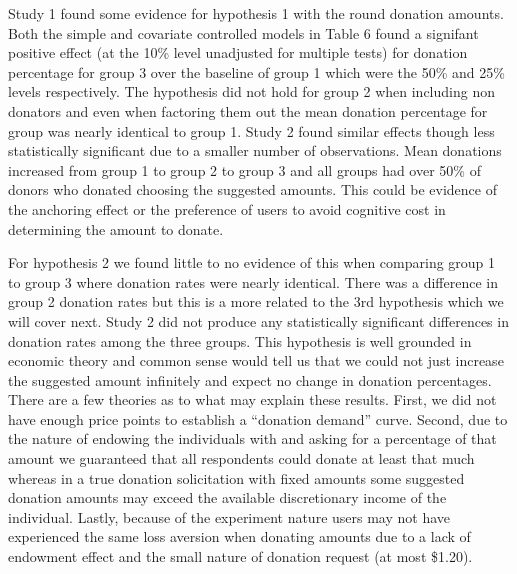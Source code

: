 \documentclass[]{article}
\begin{document}
Study 1 found some evidence for hypothesis 1 with the round donation
amounts. Both the simple and covariate controlled models in Table 6
found a signifant positive effect (at the 10\% level unadjusted for
multiple tests) for donation percentage for group 3 over the baseline of
group 1 which were the 50\% and 25\% levels respectively. The hypothesis
did not hold for group 2 when including non donators and even when
factoring them out the mean donation percentage for group was nearly
identical to group 1. Study 2 found similar effects though less
statistically significant due to a smaller number of observations. Mean
donations increased from group 1 to group 2 to group 3 and all groups
had over 50\% of donors who donated choosing the suggested amounts. This
could be evidence of the anchoring effect or the preference of users to
avoid cognitive cost in determining the amount to donate.

For hypothesis 2 we found little to no evidence of this when comparing
group 1 to group 3 where donation rates were nearly identical. There was
a difference in group 2 donation rates but this is a more related to the
3rd hypothesis which we will cover next. Study 2 did not produce any
statistically significant differences in donation rates among the three
groups. This hypothesis is well grounded in economic theory and common
sense would tell us that we could not just increase the suggested amount
infinitely and expect no change in donation percentages. There are a few
theories as to what may explain these results. First, we did not have
enough price points to establish a ``donation demand'' curve. Second,
due to the nature of endowing the individuals with and asking for a
percentage of that amount we guaranteed that all respondents could
donate at least that much whereas in a true donation solicitation with
fixed amounts some suggested donation amounts may exceed the available
discretionary income of the individual. Lastly, because of the
experiment nature users may not have experienced the same loss aversion
when donating amounts due to a lack of endowment effect and the small
nature of donation request (at most \$1.20).
\end{document}
